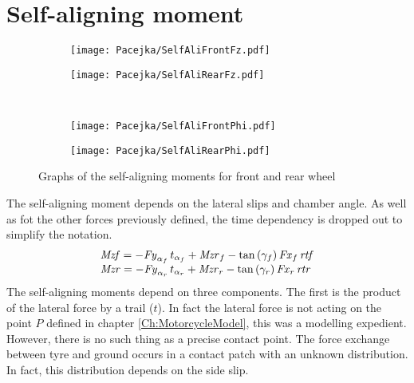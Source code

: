 \section{Self-aligning moment}
%
\begin{figure}[hbt]
    \begin{subfigure}{.5\textwidth}
        \texttt{[image: Pacejka/SelfAliFrontFz.pdf]}
        \caption{}
        \label{fig:sa1a}
    \end{subfigure}%
    \begin{subfigure}{.5\textwidth}
        \texttt{[image: Pacejka/SelfAliRearFz.pdf]}
        \caption{}
        \label{fig:sa1b}
    \end{subfigure}\\
    \begin{subfigure}{.5\textwidth}
        \texttt{[image: Pacejka/SelfAliFrontPhi.pdf]}
        \caption{}
        \label{fig:sa1c}
    \end{subfigure}%
    \begin{subfigure}{.5\textwidth}
        \texttt{[image: Pacejka/SelfAliRearPhi.pdf]}
        \caption{}
        \label{fig:sa1d}
    \end{subfigure}
    \caption{Graphs of the self-aligning moments for front and rear wheel}
\end{figure}
%
%
The self-aligning moment depends on the lateral slips and chamber angle. As well as fot the other forces previously defined, the time dependency is dropped out to simplify the notation.  
%
\begin{equation}
    \begin{array}{l} 
        {\it Mzf}  =-{\it Fy}_{
        \alpha_{f}}\,t_{\alpha_{f}}+{\it Mzr}_{f}-\tan \left( \gamma_{f}
         \right) {\it Fx}_{f}\,{\it rtf}\\ {\it Mzr} =-{\it Fy}_{\alpha_{r}}\,t_{\alpha_{r}}+{\it Mzr}_{r}-\tan
         \left( \gamma_{r} \right) {\it Fx}_{r}\,{\it rtr}
    \end{array}          
\end{equation}
%
The self-aligning moments depend on three components. The first is the product of the lateral force by a trail ($t$). In fact the lateral force is not acting on the point $P$ defined in chapter \ref{Ch:MotorcycleModel}, this was a modelling expedient. However, there is no such thing as a precise contact point. The force exchange between tyre and ground occurs in a contact patch with an unknown distribution. In fact, this distribution depends on the side slip.\\

